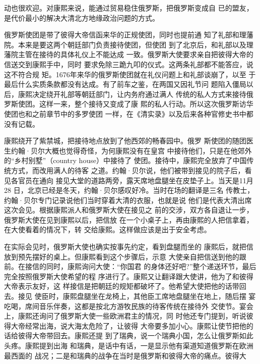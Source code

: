 动也很欢迎。对康熙来说，能通过贸易稳住俄罗斯，把俄罗斯变成自%
已的盟友，是代价最小的解决大清北方地缘政治问题的方式。%
\par
俄罗斯使团是带了彼得大帝信函来华的正规使团，同时也提前通%
知了礼部和理藩院。本来是要这两个朝廷部门负责接待使团，但使团%
到了北京后，和礼部以及理藩院主管在接待的具体礼仪上不能达成%
一致。俄罗斯大使要求亲自把彼得大帝的信送交到康熙手中，同时%
要求免除三跪九叩的仪式。这两条礼部都不能答应，说这不符合规%
矩。1676年来华的俄罗斯使团就在礼仪问题上和礼部谈崩了，以至%
于最后什么实质条款都没有达成。有了前车之鉴，在两国又因礼节问%
题陷入僵局以后，康熙决定绕开礼部等朝廷部门，让内务府通过满人%
传统的私人方式来接待俄罗斯使团。这样一来，整个接待又变成了康%
熙的私人行动。所以这次俄罗斯访华使团也和之前章节中的多罗使团%
一样，在《清实录》以及后来各种官修史书中都没有记载。%
\par
康熙绕开了紫禁城，把接待地点放到了他西郊的畅春园中。俄罗%
斯使团的随团医生约翰·贝尔大概也觉得奇怪，为何康熙没有在皇宫%
中接待他们，只是在他郊外的“乡村别墅”（country house）中接待了%
使团。接待中，康熙完全放弃了中国传统方式，而改用满人的待客%
之道。约翰·贝尔说，他们被带到接见的院子后，看见各官员在通向%
接见大堂的道路两旁，露天席地盘腿坐在皮垫子上。当天是11月28%
日，北京已经是冬天，约翰·贝尔感叹好冷。当时在场的翻译是三名%
传教士，约翰·贝尔专门记录说他们当时穿着大清的衣服，也就是说%
他们是代表大清出席这次会见。根据康熙派人和俄罗斯大使在接见之%
前的交涉，双方各自退让一步，俄罗斯大使在见到康熙以后，把信放%
在一个小桌子上，再由康熙的人把信拿着，在大使看着的情况下，转%
交给康熙。这样做应该是出于安全考虑。%
\par
在实际会见时，俄罗斯大使也确实按事先约定，看到盘腿而坐的%
康熙后，就把信放到预先摆好的桌上。但康熙看到这个步骤后，示意%
大使亲自把信送到他的跟前。在接信的同时，康熙询问大使：“你国君%
的身体还好吧?”整个递送环节，最后完全按照俄罗斯大使希望的程%
序进行了。康熙又让翻译跟大使讲，他为了和彼得大帝表示友好，这%
样接信是把朝廷的规矩都破坏了。他希望大使把他的话带回去。接见%
使臣时，康熙盘腿坐在龙椅上，其他臣工席地盘腿坐在地上，随后摆%
宴吃喝，席间音乐伴奏，这都是按北方游牧民族的待客传统在接待外%
交使节。宴会上，康熙还询问了俄罗斯大使一些欧洲君主的情况，同%
时他还专门提到，听说彼得大帝经常出海，说大海太危险了，让彼得%
大帝要多加小心。康熙让使节把他的话给彼得大帝带回去。康熙还提%
到了瑞典，说一个瑞典小国，怎么让俄罗斯如此头疼。康熙提到出海%
和瑞典，是话中有话，一是显示他有渠道知道俄罗斯在欧洲最西面的%
战况；二是和瑞典的战争在当时是俄罗斯和彼得大帝的痛点。彼得大%
